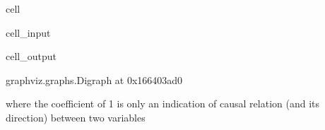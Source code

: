 \documentclass[letterpaper,10pt,english]{jupyterBook}
\begin{document}
\begin{sphinxuseclass}{cell}\begin{sphinxVerbatimInput}

\begin{sphinxuseclass}{cell_input}
\begin{sphinxVerbatim}[commandchars=\\\{\}]
   

  \PYG{p}{[}
    \PYG{p}{[}  \PYG{p}{]}   
    \PYG{p}{[}  \PYG{p}{]}   
    \PYG{p}{[}  \PYG{p}{]}    
\PYG{p}{]}

 \PYG{p}{[}  \PYG{p}{]}
\end{sphinxVerbatim}

\end{sphinxuseclass}\end{sphinxVerbatimInput}
\begin{sphinxVerbatimOutput}

\begin{sphinxuseclass}{cell_output}
\begin{sphinxVerbatim}[commandchars=\\\{\}]
\PYGZlt{}graphviz.graphs.Digraph at 0x166403ad0\PYGZgt{}
\end{sphinxVerbatim}

\end{sphinxuseclass}\end{sphinxVerbatimOutput}

\end{sphinxuseclass}
\sphinxAtStartPar
where the coefficient of 1 is only an indication of causal relation (and its direction) between two variables
\end{document}
